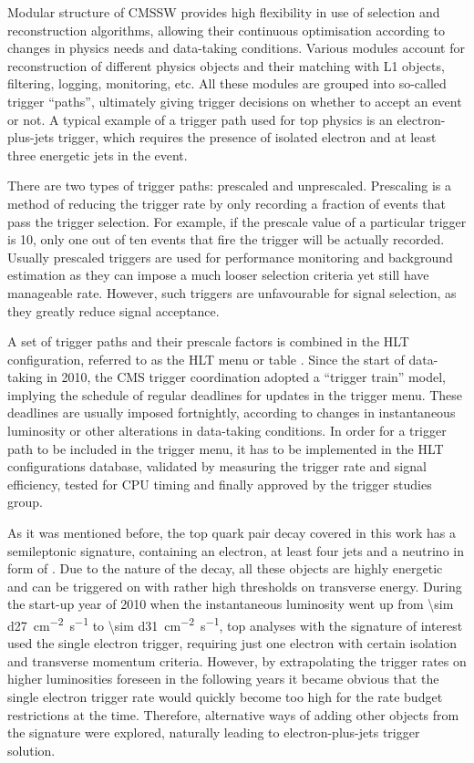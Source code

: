 Modular structure of CMSSW provides high flexibility in use of selection and reconstruction algorithms, allowing their
continuous optimisation according to changes in physics needs and data-taking conditions. Various modules account for
reconstruction of different physics objects and their matching with L1 objects, filtering, logging, monitoring, etc. All
these modules are grouped into so-called trigger ``paths'', ultimately giving trigger decisions on whether to accept an
event or not. A typical example of a trigger path used for top physics is an electron-plus-jets trigger, which requires
the presence of isolated electron and at least three energetic jets in the event.

There are two types of trigger paths: prescaled and unprescaled. Prescaling is a method of reducing the trigger rate by
only recording a fraction of events that pass the trigger selection. For example, if the prescale value of a particular
trigger is 10, only one out of ten events that fire the trigger will be actually recorded. Usually prescaled triggers
are used for performance monitoring and background estimation as they can impose a much looser selection criteria yet
still have manageable rate. However, such triggers are unfavourable for signal selection, as they greatly reduce signal
acceptance.

A set of trigger paths and their prescale factors is combined in the HLT configuration, referred to as the HLT menu or
table \autocite{HLT_commissioning}. Since the start of data-taking in 2010, the CMS trigger coordination adopted a
``trigger train'' model, implying the schedule of regular deadlines for updates in the trigger menu. These deadlines are
usually imposed fortnightly, according to changes in instantaneous luminosity or other alterations in data-taking
conditions. In order for a trigger path to be included in the trigger menu, it has to be implemented in the HLT
configurations database, validated by measuring the trigger rate and signal efficiency, tested for CPU timing and
finally approved by the trigger studies group.

As it was mentioned before, the top quark pair decay covered in this work has a semileptonic signature, containing an
electron, at least four jets and a neutrino in form of \MET. Due to the nature of the decay, all these objects are
highly energetic and can be triggered on with rather high thresholds on transverse energy. During the start-up year of
2010 when the instantaneous luminosity went up from \SI{\sim d27}{\cm^{-2} s^{-1}} to \SI{\sim d31}{\cm^{-2} s^{-1}},
top analyses with the signature of interest used the single electron trigger, requiring just one electron with certain
isolation and transverse momentum criteria. However, by extrapolating the trigger rates on higher luminosities foreseen
in the following years it became obvious that the single electron trigger rate would quickly become too high for the
rate budget restrictions at the time. Therefore, alternative ways of adding other objects from the \ttbar signature were
explored, naturally leading to electron-plus-jets trigger solution.


